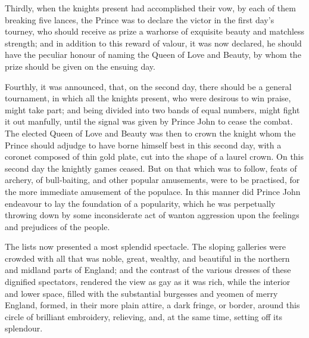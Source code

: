 Thirdly, when the knights present had accomplished their vow, by each of
them breaking five lances, the Prince was to declare the victor in the
first day's tourney, who should receive as prize a warhorse of exquisite
beauty and matchless strength; and in addition to this reward of valour,
it was now declared, he should have the peculiar honour of naming the
Queen of Love and Beauty, by whom the prize should be given on the
ensuing day.

Fourthly, it was announced, that, on the second day, there should be a
general tournament, in which all the knights present, who were desirous
to win praise, might take part; and being divided into two bands of
equal numbers, might fight it out manfully, until the signal was given
by Prince John to cease the combat. The elected Queen of Love and Beauty
was then to crown the knight whom the Prince should adjudge to have
borne himself best in this second day, with a coronet composed of thin
gold plate, cut into the shape of a laurel crown. On this second day the
knightly games ceased. But on that which was to follow, feats of
archery, of bull-baiting, and other popular amusements, were to be
practised, for the more immediate amusement of the populace. In this
manner did Prince John endeavour to lay the foundation of a popularity,
which he was perpetually throwing down by some inconsiderate act of
wanton aggression upon the feelings and prejudices of the people.

The lists now presented a most splendid spectacle. The sloping galleries
were crowded with all that was noble, great, wealthy, and beautiful in
the northern and midland parts of England; and the contrast of the
various dresses of these dignified spectators, rendered the view as gay
as it was rich, while the interior and lower space, filled with the
substantial burgesses and yeomen of merry England, formed, in their more
plain attire, a dark fringe, or border, around this circle of brilliant
embroidery, relieving, and, at the same time, setting off its splendour.

